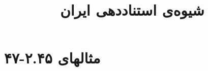 \documentclass[a4paper,10pt]{article}
\begin{document}
\title{شیوه‌ی استناددهی ایران}
\author{}
\date{}
\maketitle



\section*{مثالهای ۲.۴۵-۴۷}

\cite{پرهام1364}\\
\cite{پورممتاز1381}\\
\\
\cite{حافظ1379}\\
\\






\end{document}
